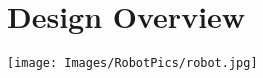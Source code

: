 \documentclass[
letterpaper, %
11pt, %
twoside,
onecolumn, %
openright, %
]{report}
\begin{document}
% 


\cleardoublepage 
\chapter{Design Overview}
\vspace{3em}
\begin{minipage}[c]{\linewidth}
\centering
\texttt{[image: Images/RobotPics/robot.jpg]}
\end{minipage}









\cleardoublepage

        



\listoffigures
\end{document}

